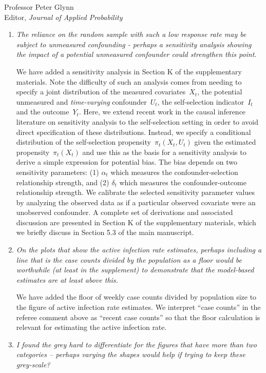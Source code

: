 \documentclass[11pt]{letter} %
\begin{document}
\begin{letter}{Professor
	Peter Glynn\\
	Editor, {\em Journal of Applied Probability}}
\begin{enumerate}
\item {\it The reliance on the random sample with such a low response rate may be subject to unmeasured confounding - perhaps a sensitivity analysis showing the impact of a potential unmeasured confounder could strengthen this point.}

\vspace{5mm}
We have added a sensitivity analysis in Section K of the supplementary materials. Note the difficulty of such an analysis comes from needing to specify a joint distribution of the measured covariates~$X_t$, the potential unmeasured and \emph{time-varying} confounder~$U_t$, the self-selection indicator~$I_t$ and the outcome~$Y_t$.  Here, we extend recent work in the causal inference literature on sensitivity analysis to the self-selection setting in order to avoid direct specification of these distributions.  Instead, we specify a conditional distribution of the self-selection propensity~$\pi_t(X_t, U_t)$ given the estimated propensity~$\pi_t (X_t)$ and use this as the basis for a sensitivity analysis to derive a simple expression for potential bias.  The bias depends on two sensitivity parameters: (1) $\alpha_t$ which measures the confounder-selection relationship strength, and (2) $\delta_t$ which measures the confounder-outcome relationship strength.  We calibrate the selected sensitivity parameter values by analyzing the observed data as if a particular observed covariate were an unobserved confounder.  A complete set of derivations and associated discussion are presented in Section K of the supplementary materials, which we briefly discuss in Section 5.3 of the main manuscript.
\vspace{5mm}

\item {\it On the plots that show the active infection rate estimates, perhaps including a line that is the case counts divided by the population as a floor would be worthwhile (at least in the supplement) to demonstrate that the model-based estimates are at least above this.}

\vspace{5mm}
We have added the floor of weekly case counts divided by population size to the figure of active infection rate estimates.  We interpret ``case counts'' in the referee comment above as ``recent case counts'' so that the floor calculation is relevant for estimating the active infection rate.
\vspace{5mm}

\item {\it I found the grey hard to differentiate for the figures that have more than two categories – perhaps varying the shapes would help if trying to keep these grey-scale?}


\end{enumerate}
\end{letter}
\end{document}
